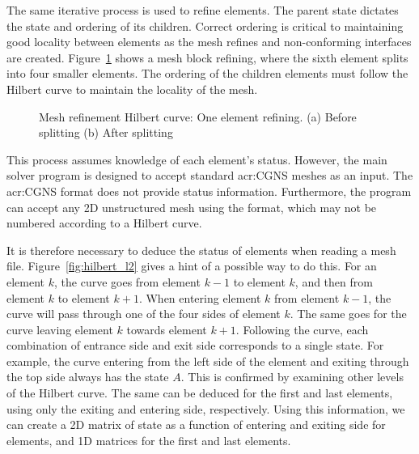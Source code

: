 The same iterative process is used to refine elements. The parent state dictates the state and
ordering of its children. Correct ordering is critical to maintaining good locality between elements
as the mesh refines and non-conforming interfaces are created. Figure~\ref{fig:hilbert_refining}
shows a mesh block refining, where the sixth element splits into four smaller elements. The ordering
of the children elements must follow the Hilbert curve to maintain the locality of the mesh.

\begin{figure}[H]
    \centering
    \hfill
    \caption{Mesh refinement Hilbert curve: One element refining. (a) Before splitting (b) After splitting}\label{fig:hilbert_refining}
\end{figure}

This process assumes knowledge of each element's status. However, the main solver program is
designed to accept standard \acrshort{acr:CGNS} meshes as an input. The \acrshort{acr:CGNS} format
does not provide status information. Furthermore, the program can accept any 2D unstructured mesh
using the format, which may not be numbered according to a Hilbert curve. 

It is therefore necessary to deduce the status of elements when reading a mesh file.
Figure~\ref{fig:hilbert_l2} gives a hint of a possible way to do this. For an element \(k\), the
curve goes from element \(k - 1\) to element \(k\), and then from element \(k\) to element \(k +
1\). When entering element \(k\) from element \(k - 1\), the curve will pass through one of the four
sides of element \(k\). The same goes for the curve leaving element \(k\) towards element \(k + 1\).
Following the curve, each combination of entrance side and exit side corresponds to a single state.
For example, the curve entering from the left side of the element and exiting through the top side
always has the state \(A\). This is confirmed by examining other levels of the Hilbert curve. The
same can be deduced for the first and last elements, using only the exiting and entering side,
respectively. Using this information, we can create a 2D matrix of state as a function of entering
and exiting side for elements, and 1D matrices for the first and last elements.

